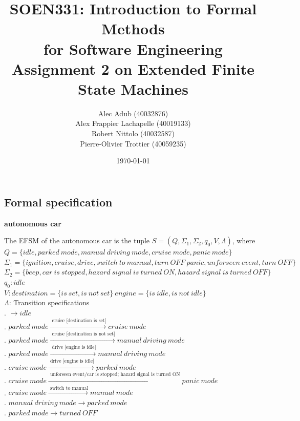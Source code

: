 \documentclass[12pt]{article}
\title{SOEN331: Introduction to Formal Methods\\for Software Engineering\\
Assignment 2 on Extended Finite State Machines}
\author{\begin{tabular}{c}
Alec Adub (40032876) \tabularnewline
Alex Frappier Lachapelle (40019133) \tabularnewline
Robert Nittolo (40032587) \tabularnewline
Pierre-Olivier Trottier (40059235) \tabularnewline\\
\end{tabular}
}
\date{\today}
\begin{document}
\begin{spacing}{1.5}

\maketitle

\newpage

\section{Formal specification}

\noindent \textbf{autonomous car}

\noindent The EFSM of the autonomous car is the tuple $S = (Q, \Sigma_1, \Sigma_2, q_0, V, \Lambda)$, where\\

\noindent $Q = \{idle, parked~mode, manual~ driving~mode, cruise~mode, panic~mode\}$\\
\noindent $\Sigma_1 = \{ignition, cruise, drive, switch~to~manual, turn~OFF~panic, unforseen~event, turn~OFF\}$\\
\noindent $\Sigma_2 = \{beep, car~is~stopped,  hazard~signal~is~turned~ON, hazard~signal~is~turned~OFF\}$\\
\noindent $q_0: idle$\\
\noindent $V: destination = \{is~set, is~not~ set\}~engine = \{is~idle, is~not~idle\}$\\
\noindent $\Lambda$: Transition specifications\\
. $\rightarrow idle$\\
. $parked~mode \xrightarrow {\text { cruise~[destination~is~set]}} cruise~mode$\\
. $parked~mode \xrightarrow {\text { cruise~[destination~is~not~set]}} manual~driving~mode$\\
. $parked~mode \xrightarrow {\text { drive~[engine~is~idle]}} manual~driving~mode$\\
. $cruise~mode \xrightarrow {\text { drive~[engine~is~idle]}} parked~mode$\\
. $cruise~mode \xrightarrow {\text { unforseen~event/car~is~stopped;~hazard~signal~is~turned~ON}} panic~mode$\\
. $cruise~mode \xrightarrow {\text { switch~to~manual}} manual~mode$\\
. $manual~driving~mode \rightarrow  parked~mode$\\
. $parked~mode \rightarrow   turned~OFF$\\



\end{spacing}
\end{document}
